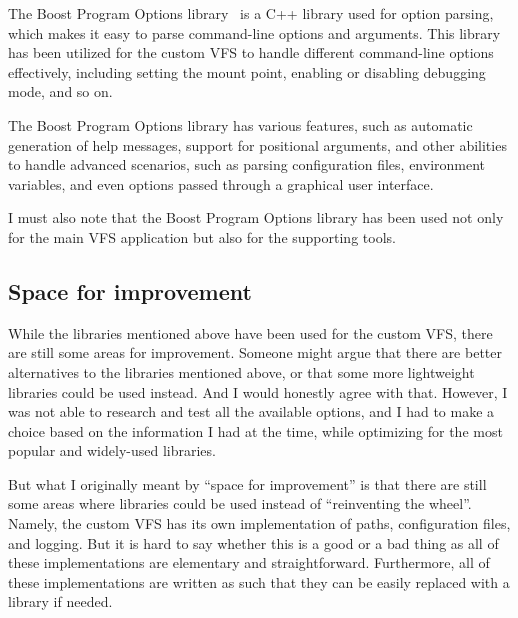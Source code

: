 The Boost Program Options library~\cite{boost_program_options} is a C++ library used for option parsing, which makes it easy to parse command-line options and arguments.
This library has been utilized for the custom VFS to handle different command-line options effectively, including setting the mount point, enabling or disabling debugging mode, and so on.

The Boost Program Options library has various features, such as automatic generation of help messages, support for positional arguments, and other abilities to handle advanced scenarios, such as parsing configuration files, environment variables, and even options passed through a graphical user interface.

I must also note that the Boost Program Options library has been used not only for the main VFS application but also for the supporting tools.

\subsection{Space for improvement}\label{subsec:libs-space-for-improvement}

While the libraries mentioned above have been used for the custom VFS, there are still some areas for improvement.
Someone might argue that there are better alternatives to the libraries mentioned above, or that some more lightweight libraries could be used instead.
And I would honestly agree with that.
However, I was not able to research and test all the available options, and I had to make a choice based on the information I had at the time, while optimizing for the most popular and widely-used libraries.

But what I originally meant by ``space for improvement'' is that there are still some areas where libraries could be used instead of ``reinventing the wheel''.
Namely, the custom VFS has its own implementation of paths, configuration files, and logging.
But it is hard to say whether this is a good or a bad thing as all of these implementations are elementary and straightforward.
Furthermore, all of these implementations are written as such that they can be easily replaced with a library if needed.